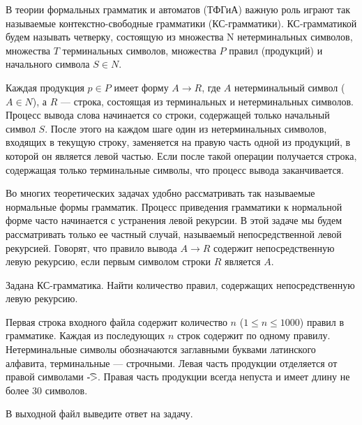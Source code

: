 В теории формальных грамматик и автоматов (ТФГиА) важную роль играют так называемые контекстно-свободные грамматики (КС-грамматики). КС-грамматикой будем называть четверку, состоящую из множества N нетерминальных символов, множества $T$ терминальных символов, множества $P$ правил (продукций) и начального символа $S \in N$. 

Каждая продукция $p \in P$ имеет форму $A \rightarrow R$, где $A$ нетерминальный символ ($A \in N$), а $R$ --- строка, состоящая из терминальных и нетерминальных символов. Процесс вывода слова начинается со строки, содержащей только начальный символ $S$. После этого на каждом шаге один из нетерминальных символов, входящих в текущую строку, заменяется на правую часть одной из продукций, в которой он является левой частью. Если после такой операции получается строка, содержащая только терминальные символы, что процесс вывода заканчивается. 

Во многих теоретических задачах удобно рассматривать так называемые нормальные формы грамматик. Процесс приведения грамматики к нормальной форме часто начинается с устранения левой рекурсии. В этой задаче мы будем рассматривать только ее частный случай, называемый непосредственной левой рекурсией. Говорят, что правило вывода $A \rightarrow R$ содержит непосредственную левую рекурсию, если первым символом строки $R$ является $A$. 

Задана КС-грамматика. Найти количество правил, содержащих непосредственную левую рекурсию. 


\InputFile

Первая строка входного файла содержит количество $n$ ($1 \le n \le 1000$) правил в грамматике. Каждая из последующих $n$ строк содержит по одному правилу. Нетерминальные символы обозначаются заглавными буквами латинского алфавита, терминальные --- строчными. Левая часть продукции отделяется от правой символами \t{->}. Правая часть продукции всегда непуста и имеет длину не более $30$ символов. 

\OutputFile

В выходной файл выведите ответ на задачу. 

\SAMPLES
